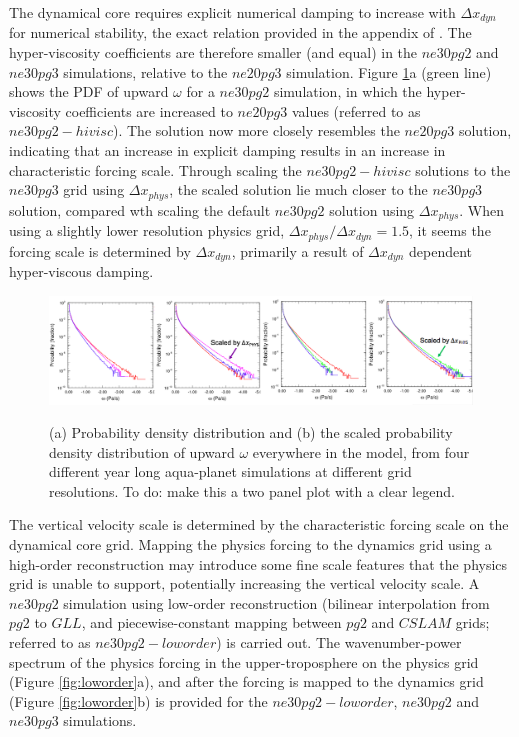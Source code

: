 \documentclass{agujournal}
\begin{document}
The dynamical core requires explicit numerical damping to increase with $\Delta x_{dyn}$ for numerical stability, the exact relation provided in the appendix of \cite{LetAl2018JAMES}. The hyper-viscosity coefficients are therefore smaller (and equal) in the $ne30pg2$ and $ne30pg3$ simulations, relative to the $ne20pg3$ simulation. Figure \ref{fig:pg2panel}a (green line) shows the PDF of upward $\omega$ for a $ne30pg2$ simulation, in which the hyper-viscosity coefficients are increased to $ne20pg3$ values (referred to as $ne30pg2-hivisc$). The solution now more closely resembles the $ne20pg3$ solution, indicating that an increase in explicit damping results in an increase in characteristic forcing scale. Through scaling the $ne30pg2-hivisc$ solutions to the $ne30pg3$ grid using $\Delta x_{phys}$, the scaled solution lie much closer to the $ne30pg3$ solution, compared wth scaling the default $ne30pg2$ solution using $\Delta x_{phys}$. When using a slightly lower resolution physics grid, $\Delta x_{phys}/\Delta x_{dyn} = 1.5$, it seems the forcing scale is determined by $\Delta x_{dyn}$, primarily a result of $\Delta x_{dyn}$ dependent hyper-viscous damping.

\begin{figure}[t]
\begin{center}
\noindent\includegraphics[width=30pc,angle=0]{figs/pdf-panel-hypervisc.png}\\
\end{center}
\caption{(a) Probability density distribution and (b) the scaled probability density distribution of upward $\omega$ everywhere in the model, from four different year long aqua-planet simulations at different grid resolutions. {\color{red}To do: make this a two panel plot with a clear legend.}}
\label{fig:pg2panel}
\end{figure}

The vertical velocity scale is determined by the characteristic forcing scale on the dynamical core grid. Mapping the physics forcing to the dynamics grid using a high-order reconstruction may introduce some fine scale features that the physics grid is unable to support, potentially increasing the vertical velocity scale. A $ne30pg2$ simulation using low-order reconstruction (bilinear interpolation from $pg2$ to $GLL$, and piecewise-constant mapping between $pg2$ and $CSLAM$ grids; referred to as $ne30pg2-loworder$) is carried out. The wavenumber-power spectrum of the physics forcing in the upper-troposphere on the physics grid (Figure \ref{fig:loworder}a), and after the forcing is mapped to the dynamics grid (Figure \ref{fig:loworder}b) is provided for the $ne30pg2-loworder$, $ne30pg2$ and $ne30pg3$ simulations. 
\end{document}
